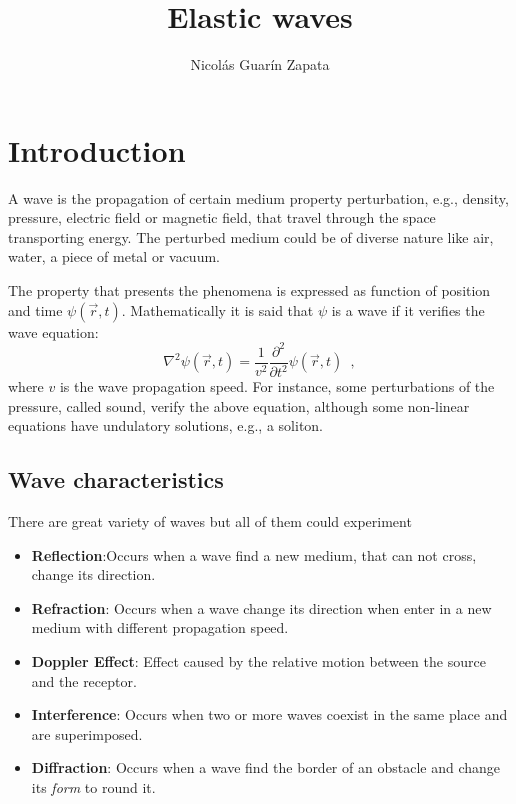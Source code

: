 \documentclass[12pt,letterpaper]{article}
\author{Nicol\'as Guar\'in Zapata}
\title{\textbf{Elastic waves}}
\begin{document}
\maketitle

\section{Introduction}
A wave is the propagation of certain medium property perturbation, e.g., density, pressure, electric field or magnetic field, that travel through the space transporting energy. The perturbed medium could be of diverse nature like air, water, a piece of metal or vacuum.

The property that presents the phenomena is expressed as function of position and time $\psi(\vec{r},t)$. Mathematically  it is said that $\psi$ is a wave if it verifies the wave equation:
\[\nabla^2 \psi(\vec{r},t)= \frac{1}{v^2} \frac{\partial^2 }{\partial t^2}\psi(\vec{r},t) \enspace ,\]
where $v$ is the wave propagation speed. For instance, some perturbations of the pressure, called sound, verify the above equation, although some non-linear equations have undulatory solutions, e.g., a soliton. 

\subsection{Wave characteristics}
There are great variety of waves but all of them could experiment
\begin{itemize}
\item \textbf{Reflection}:Occurs when a wave find a new medium, that can not cross, change its direction.

\item \textbf{Refraction}: Occurs when a wave change its direction when enter in a new medium with different propagation speed.

\item \textbf{Doppler Effect}: Effect caused by the relative motion between the source and the receptor.

\item \textbf{Interference}: Occurs when two or more waves coexist in the same place and are superimposed.

\item \textbf{Diffraction}: Occurs when a wave find the border of an obstacle and change its \emph{form} to round it.
\end{itemize}
\end{document}

